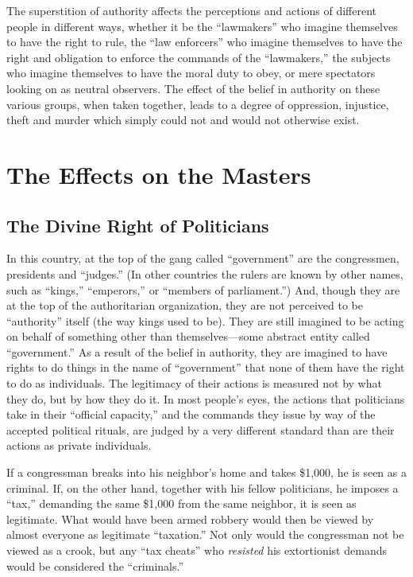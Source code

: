 \documentclass{book}
\begin{document}
The superstition of authority affects the perceptions and actions of different people in different ways, whether it be the \enquote{lawmakers} who imagine themselves to have the right to rule, the \enquote{law enforcers} who imagine themselves to have the right and obligation to enforce the commands of the \enquote{lawmakers,} the subjects who imagine themselves to have the moral duty to obey, or mere spectators looking on as neutral observers. The effect of the belief in authority on these various groups, when taken together, leads to a degree of oppression, injustice, theft and murder which simply could not and would not otherwise exist.

\chapter{The Effects on the Masters}

\section{The Divine Right of Politicians}

In this country, at the top of the gang called \enquote{government} are the congressmen, presidents and \enquote{judges.} (In other countries the rulers are known by other names, such as \enquote{kings,} \enquote{emperors,} or \enquote{members of parliament.}) And, though they are at the top of the authoritarian organization, they are not perceived to be \enquote{authority} itself (the way kings used to be). They are still imagined to be acting on behalf of something other than themselves---some abstract entity called \enquote{government.} As a result of the belief in authority, they are imagined to have rights to do things in the name of \enquote{government} that none of them have the right to do as individuals. The legitimacy of their actions is measured not by what they do, but by how they do it. In most people's eyes, the actions that politicians take in their \enquote{official capacity,} and the commands they issue by way of the accepted political rituals, are judged by a very different standard than are their actions as private individuals.

If a congressman breaks into his neighbor's home and takes \$1,000, he is seen as a criminal. If, on the other hand, together with his fellow politicians, he imposes a \enquote{tax,} demanding the same \$1,000 from the same neighbor, it is seen as legitimate. What would have been armed robbery would then be viewed by almost everyone as legitimate \enquote{taxation.} Not only would the congressman not be viewed as a crook, but any \enquote{tax cheats} who \emph{resisted} his extortionist demands would be considered the \enquote{criminals.}
\end{document}
